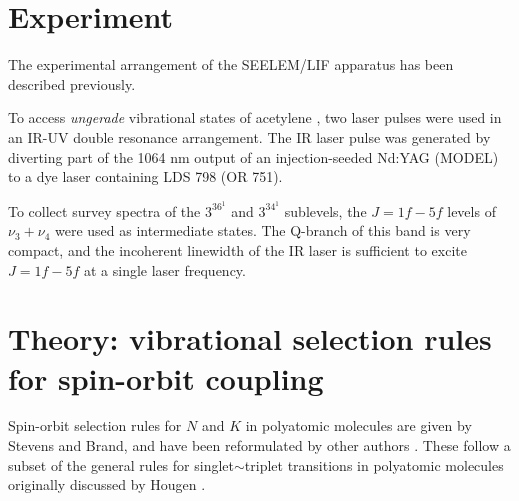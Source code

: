 \documentclass[12pt]{mitthesis}
\begin{document}
\section{Experiment}



The experimental arrangement of the SEELEM/LIF apparatus has been
described previously.


To access \emph{ungerade} vibrational states of acetylene \astate, two
laser pulses were used in an IR-UV double resonance arrangement.  The
IR laser pulse was generated by diverting part of the 1064 nm output
of an injection-seeded Nd:YAG (MODEL) to a dye laser containing LDS
798 (OR 751).

To collect survey spectra of the $3^36^1$ and $3^34^1$ 
sublevels, the $J=1f-5f$ levels of \xstate\ $\nu_3+\nu_4$
were used as intermediate states.  The Q-branch of this band is very
compact, and the incoherent linewidth of the IR laser is sufficient to
excite $J=1f-5f$ at a single laser frequency.



\section{Theory: vibrational selection rules for spin-orbit coupling}

  Spin-orbit selection rules for $N$ and $K$ in
polyatomic molecules are given by Stevens and Brand, and have been
reformulated by other authors \cite{stevens73, howard78, dupre84}.
These follow a subset of the general rules for singlet$\sim$triplet
transitions in polyatomic molecules originally discussed by Hougen
\cite{hougen64}.



\end{document}
